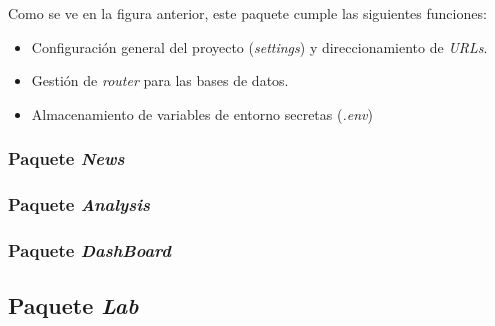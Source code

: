 
Como se ve en la figura anterior, este paquete cumple las siguientes funciones:

\begin{itemize}
\tightlist
\item
Configuración general del proyecto (\emph{settings}) y direccionamiento de \emph{URLs}.
\item
Gestión de \emph{router} para las bases de datos.
\item
Almacenamiento de variables de entorno secretas (\emph{.env})
\end{itemize}


\subsubsection{Paquete \emph{News}}


\subsubsection{Paquete \emph{Analysis}}


\subsubsection{Paquete \emph{DashBoard}}

\subsection{Paquete \emph{Lab}}